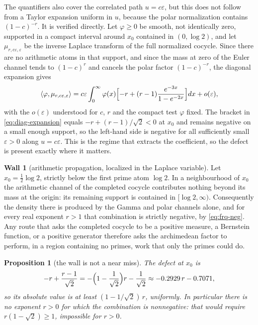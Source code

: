 \documentclass[11pt]{amsart}
\newtheorem{proposition}[theorem]{Proposition}
\theoremstyle{definition}
\theoremstyle{remark}
\theoremstyle{definition}
\newtheorem{obstruction}{Wall}[section]
\newcommand{\eps}{\varepsilon}
\begin{document}
The quantifiers also cover the correlated path $u=c\eps$, but this does not follow from a Taylor
expansion uniform in $u$, because the polar normalization contains $(1-c)^{-r}$. It is verified
directly. Let $\varphi\ge0$ be smooth, not identically zero, supported in a compact interval around
$x_0$ contained in $(0,\log2)$, and let $\mu_{r,c\eps,\eps}$ be the inverse Laplace transform of
the full normalized cocycle. Since there are no arithmetic atoms in that support, and since the
mass at zero of the Euler channel tends to $(1-c)^r$ and cancels the polar factor $(1-c)^{-r}$, the
diagonal expansion gives
\begin{equation}\label{eq:diag-expansion}
   \langle\varphi,\mu_{r,c\eps,\eps}\rangle
   =c\eps\int_0^\infty\varphi(x)
   \Bigl[-r+(r-1)\frac{e^{-3x}}{1-e^{-2x}}\Bigr]dx+o(\eps),
\end{equation}
with the $o(\eps)$ understood for $c$, $r$ and the compact test $\varphi$ fixed. The bracket in
\eqref{eq:diag-expansion} equals $-r+(r-1)/\sqrt2<0$ at $x_0$ and remains negative on a small
enough support, so the left-hand side is negative for all sufficiently small $\eps>0$ along
$u=c\eps$. This is the regime that extracts the coefficient, so the defect is present exactly where
it matters.

\begin{obstruction}[arithmetic propagation, localized in the Laplace variable]\label{ob:halflog2}
Let $x_0=\tfrac12\log2$, strictly below the first prime atom $\log2$. In a neighbourhood of $x_0$
the arithmetic channel of the completed cocycle contributes nothing beyond its mass at the origin:
its remaining support is contained in $[\log2,\infty)$. Consequently the density there is produced
by the Gamma and polar channels alone, and for every real exponent $r>1$ that combination is
strictly negative, by \eqref{eq:frq-neg}. Any route that asks the completed cocycle to be a
positive measure, a Bernstein function, or a positive generator therefore asks the archimedean
factor to perform, in a region containing no primes, work that only the primes could do.
\end{obstruction}

\begin{proposition}[the wall is not a near miss]\label{prop:not-near-miss}
The defect at $x_0$ is
\begin{equation}\label{eq:defect}
   -r+\frac{r-1}{\sqrt2}=-\Bigl(1-\frac1{\sqrt2}\Bigr)r-\frac1{\sqrt2}
   \approx-0.2929\,r-0.7071 ,
\end{equation}
so its absolute value is at least $(1-1/\sqrt2)\,r$, uniformly. In particular there is
no exponent $r>0$ for which the combination is nonnegative: that would require
$r(1-\sqrt2)\ge1$, impossible for $r>0$.
\end{proposition}
\end{document}
